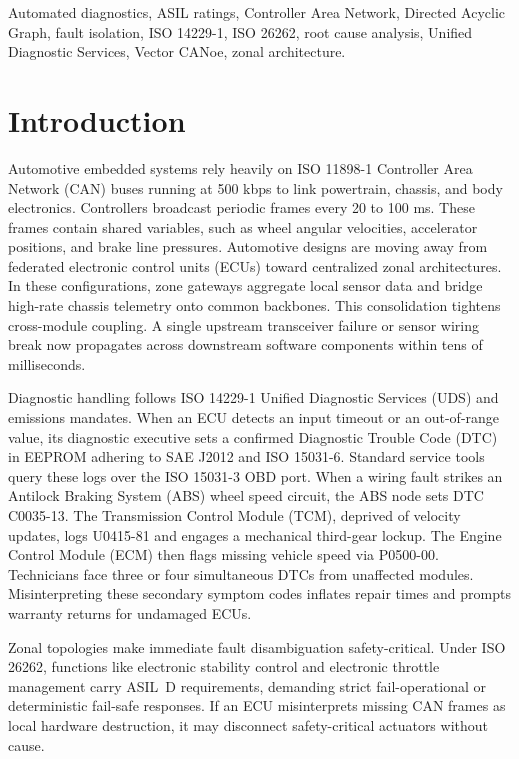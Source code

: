 \documentclass[conference]{IEEEtran}
\begin{document}
\begin{IEEEkeywords}
Automated diagnostics, ASIL ratings, Controller Area Network, Directed Acyclic Graph, fault isolation, ISO 14229-1, ISO 26262, root cause analysis, Unified Diagnostic Services, Vector CANoe, zonal architecture.
\end{IEEEkeywords}

\section{Introduction}
Automotive embedded systems rely heavily on ISO 11898-1 Controller Area Network (CAN) buses running at 500 kbps to link powertrain, chassis, and body electronics. Controllers broadcast periodic frames every 20 to 100 ms. These frames contain shared variables, such as wheel angular velocities, accelerator positions, and brake line pressures. Automotive designs are moving away from federated electronic control units (ECUs) toward centralized zonal architectures. In these configurations, zone gateways aggregate local sensor data and bridge high-rate chassis telemetry onto common backbones. This consolidation tightens cross-module coupling. A single upstream transceiver failure or sensor wiring break now propagates across downstream software components within tens of milliseconds.

Diagnostic handling follows ISO 14229-1 Unified Diagnostic Services (UDS) and emissions mandates. When an ECU detects an input timeout or an out-of-range value, its diagnostic executive sets a confirmed Diagnostic Trouble Code (DTC) in EEPROM adhering to SAE J2012 and ISO 15031-6. Standard service tools query these logs over the ISO 15031-3 OBD port. When a wiring fault strikes an Antilock Braking System (ABS) wheel speed circuit, the ABS node sets DTC C0035-13. The Transmission Control Module (TCM), deprived of velocity updates, logs U0415-81 and engages a mechanical third-gear lockup. The Engine Control Module (ECM) then flags missing vehicle speed via P0500-00. Technicians face three or four simultaneous DTCs from unaffected modules. Misinterpreting these secondary symptom codes inflates repair times and prompts warranty returns for undamaged ECUs.

Zonal topologies make immediate fault disambiguation safety-critical. Under ISO 26262, functions like electronic stability control and electronic throttle management carry ASIL~D requirements, demanding strict fail-operational or deterministic fail-safe responses. If an ECU misinterprets missing CAN frames as local hardware destruction, it may disconnect safety-critical actuators without cause. 
\end{document}
